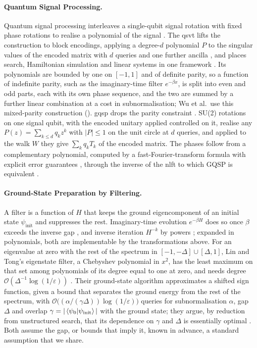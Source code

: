 \paragraph{Quantum Signal Processing.}
\label{sec:bg-qsp}

Quantum signal processing interleaves a single-qubit signal rotation with fixed phase rotations to realise a polynomial of the signal \cite{lowchuang2017qsp}. The \gls{qsvt} lifts the construction to block encodings, applying a degree-$d$ polynomial $P$ to the singular values of the encoded matrix with $d$ queries and one further ancilla \cite{gilyen2019qsvt}, and places search, Hamiltonian simulation and linear systems in one framework \cite{martyn2021grand}. Its polynomials are bounded by one on $[-1,1]$ and of definite parity, so a function of indefinite parity, such as the imaginary-time filter $e^{-\beta x}$, is split into even and odd parts, each with its own phase sequence, and the two are summed by a further linear combination at a cost in subnormalisation; Wu et al.\ use this mixed-parity construction (). \Gls{gqsp} drops the parity constraint \cite{motlagh2024gqsp}. SU(2) rotations on one signal qubit, with the encoded unitary applied controlled on it, realise any $P(z)=\sum_{k\le d}q_kz^k$ with $|P|\le1$ on the unit circle at $d$ queries, and applied to the walk $W$ they give $\sum_kq_kT_k$ of the encoded matrix. The phases follow from a complementary polynomial, computed by a fast-Fourier-transform formula with explicit error guarantees \cite{berntson2025complementary}, through the inverse of the \gls{nlft} to which GQSP is equivalent \cite{laneve2025gqspnlft,nlfft2025su2}.

\paragraph{Ground-State Preparation by Filtering.}
\label{sec:bg-filtering}

A filter is a function of $H$ that keeps the ground eigencomponent of an initial state $\psi_{\mathrm{init}}$ and suppresses the rest. Imaginary-time evolution $e^{-\beta H}$ does so once $\beta$ exceeds the inverse gap \cite{motta2020qite}, and inverse iteration $H^{-k}$ by powers \cite{kyriienko2020inverse}; expanded in polynomials, both are implementable by the transformations above. For an eigenvalue at zero with the rest of the spectrum in $[-1,-\Delta]\cup[\Delta,1]$, Lin and Tong's eigenstate filter, a Chebyshev polynomial in $x^2$, has the least maximum on that set among polynomials of its degree equal to one at zero, and needs degree $\mathcal O(\Delta^{-1}\log(1/\varepsilon))$ \cite{lintong2020filtering}. Their ground-state algorithm approximates a shifted sign function, given a bound that separates the ground energy from the rest of the spectrum, with $\mathcal O\bigl((\alpha/(\gamma\Delta))\log(1/\varepsilon)\bigr)$ queries for subnormalisation $\alpha$, gap $\Delta$ and overlap $\gamma=|\braket{\psi_0|\psi_{\mathrm{init}}}|$ with the ground state; they argue, by reduction from unstructured search, that its dependence on $\gamma$ and $\Delta$ is essentially optimal \cite{lintong2020groundstate}. Both assume the gap, or bounds that imply it, known in advance, a standard assumption that we share.

